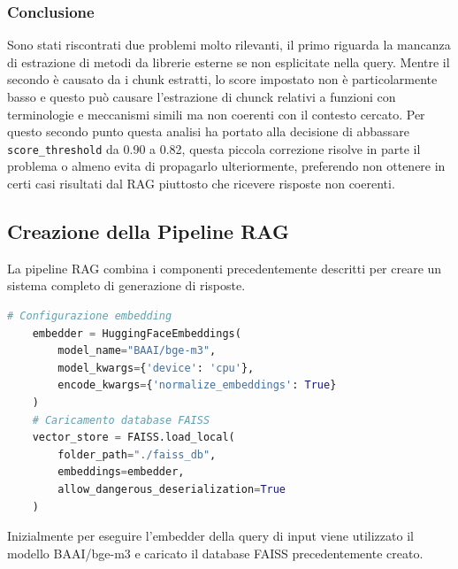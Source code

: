 \documentclass[12pt,a4paper,openright,twoside]{book}
\begin{document}
    \subsubsection{Conclusione}
    Sono stati riscontrati due problemi molto rilevanti, il primo riguarda la mancanza di estrazione di metodi da librerie esterne se non esplicitate nella query.
    Mentre il secondo è causato da i chunk estratti, lo score impostato non è particolarmente basso e questo può causare l'estrazione di chunck relativi a funzioni con terminologie e meccanismi simili ma non coerenti con il contesto cercato.
    Per questo secondo punto questa analisi ha portato alla decisione di abbassare \texttt{score\_threshold} da 0.90 a 0.82,
    questa piccola correzione risolve in parte il problema o almeno evita di propagarlo ulteriormente, preferendo non ottenere in certi casi risultati dal \ac{RAG} piuttosto che ricevere risposte non coerenti.
\subsection{Creazione della Pipeline RAG}
La pipeline RAG combina i componenti precedentemente descritti per creare un sistema completo di generazione di risposte.
\begin{lstlisting}[language=Python, caption={Caricamento database FAISS}, label={lst:Caricamento database FAISS}]
    # Configurazione embedding
    embedder = HuggingFaceEmbeddings(
        model_name="BAAI/bge-m3",
        model_kwargs={'device': 'cpu'},
        encode_kwargs={'normalize_embeddings': True}
    )
    # Caricamento database FAISS
    vector_store = FAISS.load_local(
        folder_path="./faiss_db",
        embeddings=embedder,
        allow_dangerous_deserialization=True
    )
\end{lstlisting}
Inizialmente per eseguire l'embedder della query di input viene utilizzato il modello BAAI/bge-m3 e caricato il database FAISS precedentemente creato.
\end{document}
